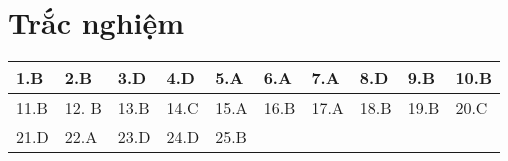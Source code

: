 \let\lesson\undefined
\newcommand{\lesson}{\phantomlesson{Bài 17.}}
\setcounter{section}{2}
\section{Trắc nghiệm}
\ANSMCQ
{	\begin{center}
		\begin{tabular}{|m{2.8em}|m{2.8em}|m{2.8em}|m{2.8em}|m{2.8em}|m{2.8em}|m{2.8em}|m{2.8em}|m{2.8em}|m{2.8em}|}
			\hline
			1.B  & 2.B  & 3.D  & 4.D  & 5.A  & 6.A  & 7.A  & 8.D  & 9.B  & 10.B  \\
			\hline
			11.B  & 12. B  & 13.B  & 14.C  & 15.A  & 16.B  & 17.A  & 18.B  & 19.B  & 20.C  \\
			\hline
			21.D  & 22.A  & 23.D  & 24.D  & 25.B  &   &   &   &   &  \\
			\hline
		\end{tabular}
	\end{center}
}
